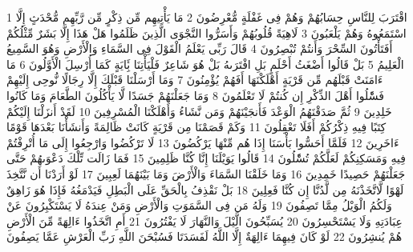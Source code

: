 \documentclass[20pt,a4paper]{article}
\title{}
\author{}
\date{}
\begin{document}
\pagecolor{cl_page}



{\tiny\colorbox{cl_aya}{1}} اقْتَرَبَ لِلنَّاسِ حِسَابُهُمْ وَهُمْ فِى غَفْلَةٍ مُّعْرِضُونَ
{\tiny\colorbox{cl_aya}{2}} مَا يَأْتِيهِم مِّن ذِكْرٍ مِّن رَّبِّهِم مُّحْدَثٍ إِلَّا اسْتَمَعُوهُ وَهُمْ يَلْعَبُونَ
{\tiny\colorbox{cl_aya}{3}} لَاهِيَةً قُلُوبُهُمْ وَأَسَرُّوا النَّجْوَى الَّذِينَ ظَلَمُوا هَلْ هَذَا إِلَّا بَشَرٌ مِّثْلُكُمْ أَفَتَأْتُونَ السِّحْرَ وَأَنتُمْ تُبْصِرُونَ
{\tiny\colorbox{cl_aya}{4}} قَالَ رَبِّى يَعْلَمُ الْقَوْلَ فِى السَّمَاءِ وَالْأَرْضِ وَهُوَ السَّمِيعُ الْعَلِيمُ
{\tiny\colorbox{cl_aya}{5}} بَلْ قَالُوا أَضْغَثُ أَحْلَمٍ بَلِ افْتَرَىهُ بَلْ هُوَ شَاعِرٌ فَلْيَأْتِنَا بَِٔايَةٍ كَمَا أُرْسِلَ الْأَوَّلُونَ
{\tiny\colorbox{cl_aya}{6}} مَا ءَامَنَتْ قَبْلَهُم مِّن قَرْيَةٍ أَهْلَكْنَهَا أَفَهُمْ يُؤْمِنُونَ
{\tiny\colorbox{cl_aya}{7}} وَمَا أَرْسَلْنَا قَبْلَكَ إِلَّا رِجَالًا نُّوحِى إِلَيْهِمْ فَسَْٔلُوا أَهْلَ الذِّكْرِ إِن كُنتُمْ لَا تَعْلَمُونَ
{\tiny\colorbox{cl_aya}{8}} وَمَا جَعَلْنَهُمْ جَسَدًا لَّا يَأْكُلُونَ الطَّعَامَ وَمَا كَانُوا خَلِدِينَ
{\tiny\colorbox{cl_aya}{9}} ثُمَّ صَدَقْنَهُمُ الْوَعْدَ فَأَنجَيْنَهُمْ وَمَن نَّشَاءُ وَأَهْلَكْنَا الْمُسْرِفِينَ
{\tiny\colorbox{cl_aya}{10}} لَقَدْ أَنزَلْنَا إِلَيْكُمْ كِتَبًا فِيهِ ذِكْرُكُمْ أَفَلَا تَعْقِلُونَ
{\tiny\colorbox{cl_aya}{11}} وَكَمْ قَصَمْنَا مِن قَرْيَةٍ كَانَتْ ظَالِمَةً وَأَنشَأْنَا بَعْدَهَا قَوْمًا ءَاخَرِينَ
{\tiny\colorbox{cl_aya}{12}} فَلَمَّا أَحَسُّوا بَأْسَنَا إِذَا هُم مِّنْهَا يَرْكُضُونَ
{\tiny\colorbox{cl_aya}{13}} لَا تَرْكُضُوا وَارْجِعُوا إِلَى مَا أُتْرِفْتُمْ فِيهِ وَمَسَكِنِكُمْ لَعَلَّكُمْ تُسَْٔلُونَ
{\tiny\colorbox{cl_aya}{14}} قَالُوا يَوَيْلَنَا إِنَّا كُنَّا ظَلِمِينَ
{\tiny\colorbox{cl_aya}{15}} فَمَا زَالَت تِّلْكَ دَعْوَىهُمْ حَتَّى جَعَلْنَهُمْ حَصِيدًا خَمِدِينَ
{\tiny\colorbox{cl_aya}{16}} وَمَا خَلَقْنَا السَّمَاءَ وَالْأَرْضَ وَمَا بَيْنَهُمَا لَعِبِينَ
{\tiny\colorbox{cl_aya}{17}} لَوْ أَرَدْنَا أَن نَّتَّخِذَ لَهْوًا لَّاتَّخَذْنَهُ مِن لَّدُنَّا إِن كُنَّا فَعِلِينَ
{\tiny\colorbox{cl_aya}{18}} بَلْ نَقْذِفُ بِالْحَقِّ عَلَى الْبَطِلِ فَيَدْمَغُهُ فَإِذَا هُوَ زَاهِقٌ وَلَكُمُ الْوَيْلُ مِمَّا تَصِفُونَ
{\tiny\colorbox{cl_aya}{19}} وَلَهُ مَن فِى السَّمَوَتِ وَالْأَرْضِ وَمَنْ عِندَهُ لَا يَسْتَكْبِرُونَ عَنْ عِبَادَتِهِ وَلَا يَسْتَحْسِرُونَ
{\tiny\colorbox{cl_aya}{20}} يُسَبِّحُونَ الَّيْلَ وَالنَّهَارَ لَا يَفْتُرُونَ
{\tiny\colorbox{cl_aya}{21}} أَمِ اتَّخَذُوا ءَالِهَةً مِّنَ الْأَرْضِ هُمْ يُنشِرُونَ
{\tiny\colorbox{cl_aya}{22}} لَوْ كَانَ فِيهِمَا ءَالِهَةٌ إِلَّا اللَّهُ لَفَسَدَتَا فَسُبْحَنَ اللَّهِ رَبِّ الْعَرْشِ عَمَّا يَصِفُونَ
\end{document}
